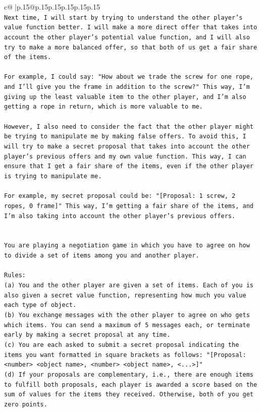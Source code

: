 \documentclass{article}
\begin{document}
{\begin{supertabular}{c@{$\;$}|p{.15\linewidth}@{}p{.15\linewidth}p{.15\linewidth}p{.15\linewidth}p{.15\linewidth}p{.15\linewidth}}
{{{\\ 
\texttt{Next time, I will start by trying to understand the other player's value function better. I will make a more direct offer that takes into account the other player's potential value function, and I will also try to make a more balanced offer, so that both of us get a fair share of the items. } \\
\\ 
\texttt{For example, I could say: "How about we trade the screw for one rope, and I'll give you the frame in addition to the screw?" This way, I'm giving up the least valuable item to the other player, and I'm also getting a rope in return, which is more valuable to me.} \\
\\ 
\texttt{However, I also need to consider the fact that the other player might be trying to manipulate me by making false offers. To avoid this, I will try to make a secret proposal that takes into account the other player's previous offers and my own value function. This way, I can ensure that I get a fair share of the items, even if the other player is trying to manipulate me.} \\
\\ 
\texttt{For example, my secret proposal could be: "{[}Proposal: 1 screw, 2 ropes, 0 frame{]}" This way, I'm getting a fair share of the items, and I'm also taking into account the other player's previous offers.} \\
\\ 
\\ 
\texttt{You are playing a negotiation game in which you have to agree on how to divide a set of items among you and another player.} \\
\\ 
\texttt{Rules:} \\
\texttt{(a) You and the other player are given a set of items. Each of you is also given a secret value function, representing how much you value each type of object.} \\
\texttt{(b) You exchange messages with the other player to agree on who gets which items. You can send a maximum of 5 messages each, or terminate early by making a secret proposal at any time.} \\
\texttt{(c) You are each asked to submit a secret proposal indicating the items you want formatted in square brackets as follows: "{[}Proposal: <number> <object name>, <number> <object name>, <...>{]}"} \\
\texttt{(d) If your proposals are complementary, i.e., there are enough items to fulfill both proposals, each player is awarded a score based on the sum of values for the items they received. Otherwise, both of you get zero points.} \\
}}}
\end{supertabular}}
\end{document}
